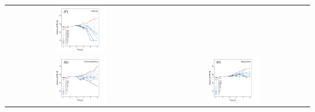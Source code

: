 \documentclass{article}
\begin{document}
\begin{center}
\begin{tabularx}{1\textwidth}{cc}
\includegraphics[trim = 0mm 0mm 0mm 0mm, clip,width=0.35\textwidth]{WT_CXregression}\\
\includegraphics[trim = 0mm 0mm 0mm 0mm, clip,width=0.35\textwidth]{WT_Chlorregression} & 
\includegraphics[trim = 0mm 0mm 0mm 0mm, clip,width=0.35\textwidth]{WT_Tetregression} \\  
\end{tabularx}
\end{center}
\end{document}

